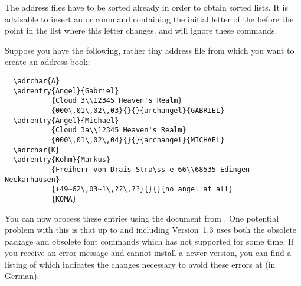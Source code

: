 The address files have to be sorted already in order to obtain sorted lists.
It is advisable to insert an  or  command
containing the initial letter of the  before the point in the
list where this letter changes.  and  will
ignore these commands.
%
\begin{Example}
  Suppose you have the following, rather tiny address file from which you
  want to create an address book:
\begin{lstlisting}
  \adrchar{A}
  \adrentry{Angel}{Gabriel}
           {Cloud 3\\12345 Heaven's Realm}
           {000\,01\,02\,03}{}{}{archangel}{GABRIEL}
  \adrentry{Angel}{Michael}
           {Cloud 3a\\12345 Heaven's Realm}
           {000\,01\,02\,04}{}{}{archangel}{MICHAEL}
  \adrchar{K}
  \adrentry{Kohm}{Markus}
           {Freiherr-von-Drais-Stra\ss e 66\\68535 Edingen-Neckarhausen}
           {+49~62\,03~1\,??\,??}{}{}{no angel at all}
           {KOMA}
\end{lstlisting}
  You can now process these entries using the  document from
  \cite{package:adrconv}. One potential problem with this is that
   up to and including Version~1.3 uses both the obsolete
   package and obsolete font commands which \KOMAScript{} has
  not supported for some time. If you receive an error message and cannot
  install a newer version, you can find a listing of  which
  indicates the changes necessary to avoid these errors at
  \cite{https://komascript.de/node/2154} (in German).
    

\end{Example}
